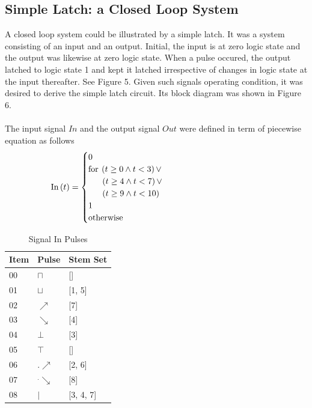 \documentclass[10pt,journal]{IEEEtran}
\begin{document}
\subsection{Simple Latch: a Closed Loop System}
A closed loop system could be illustrated by a simple latch. It was a system     consisting of an input and an output. Initial, the input is at zero logic     state and the output was likewise at zero logic state. When a pulse occured,     the output latched to logic state 1 and kept it latched irrespective of     changes in logic state at the input thereafter. See Figure 5.  Given such     signals operating condition, it was desired to derive the simple latch     circuit. Its block diagram was shown in Figure 6.\\ \ \\     The input signal $In$ and the output signal $Out$ were     defined in term of piecewise equation as follows
\begin{equation}
 \begin{minipage}{250pt}
\begin{flushleft} $\displaystyle \operatorname{In}{\left(t \right)} = \begin{cases} 0 & \\  \text{for}\: \left(t \geq 0 \wedge t < 3\right) \vee \\ \ \ \quad    \left(t \geq 4 \wedge t < 7\right) \vee \\ \ \ \quad    \left(t \geq 9 \wedge t < 10\right) \\1 & \\  \text{otherwise} \end{cases}$  \end{flushleft}
 \end{minipage}
 \end{equation}
\begin{table}[H] \caption{Signal In Pulses}\centering\begin{tabular}{|p{.4cm}|p{.5cm}|p{6.5cm}|}\hline Item&Pulse &Stem Set\\ \hline 00& \footnotesize$\sqcap$ & \footnotesize[]\\ \hline 01& \footnotesize$\sqcup$ & \footnotesize[1, 5]\\ \hline 02& \footnotesize$\nearrow$ & \footnotesize[7]\\ \hline 03& \footnotesize$\searrow$ & \footnotesize[4]\\ \hline 04& \footnotesize$\bot$ & \footnotesize[3]\\ \hline 05& \footnotesize$\top$ & \footnotesize[]\\ \hline 06& \footnotesize$.\nearrow$ & \footnotesize[2, 6]\\ \hline 07& \footnotesize$^.\searrow$ & \footnotesize[8]\\ \hline 08& \footnotesize$|$ & \footnotesize[3, 4, 7]\\ \hline \end{tabular} \end{table} 
\end{document}
